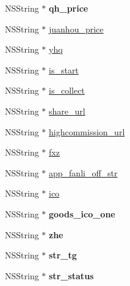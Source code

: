 \begin{DoxyCompactItemize}
N\+S\+String $\ast$ {\bfseries qh\+\_\+price}
\item 
N\+S\+String $\ast$ \mbox{\hyperlink{interface_f_n_base_product_model_adf6aed6aa71562ed139ef8aeeb3c858c}{juanhou\+\_\+price}}
\item 
N\+S\+String $\ast$ \mbox{\hyperlink{interface_f_n_base_product_model_a99460f24979c5ea79a4b1e11f45c63b7}{yhq}}
\item 
N\+S\+String $\ast$ \mbox{\hyperlink{interface_f_n_base_product_model_adcf67d2d4d13ae6539d76184c365844a}{is\+\_\+start}}
\item 
N\+S\+String $\ast$ \mbox{\hyperlink{interface_f_n_base_product_model_adc2ea1e4dc1097b9ad9f9e8a3d464330}{is\+\_\+collect}}
\item 
N\+S\+String $\ast$ \mbox{\hyperlink{interface_f_n_base_product_model_a5c05c57f213cd88591aa336cc6cd99c1}{share\+\_\+url}}
\item 
N\+S\+String $\ast$ \mbox{\hyperlink{interface_f_n_base_product_model_add360d501db9e8f3df436d807b91e7f9}{highcommission\+\_\+url}}
\item 
N\+S\+String $\ast$ \mbox{\hyperlink{interface_f_n_base_product_model_af7149fd14a3702dd6a57bf00d6695a78}{fxz}}
\item 
N\+S\+String $\ast$ \mbox{\hyperlink{interface_f_n_base_product_model_a19eb47a3b3951787f43b27b505baba39}{app\+\_\+fanli\+\_\+off\+\_\+str}}
\item 
N\+S\+String $\ast$ \mbox{\hyperlink{interface_f_n_base_product_model_af2c5e73c71634dd9f51ba6103c41dd8a}{ico}}
\item 
\mbox{\label{interface_f_n_base_product_model_a98ec430b1e9baf9fc2f5ed37c222aab5}} 
N\+S\+String $\ast$ {\bfseries goods\+\_\+ico\+\_\+one}
\item 
\mbox{\label{interface_f_n_base_product_model_a496cc8f1c07b5d0923d57818b2d2e49e}} 
N\+S\+String $\ast$ {\bfseries zhe}
\item 
\mbox{\label{interface_f_n_base_product_model_af6026572dc0cb492f6795be2b3847c56}} 
N\+S\+String $\ast$ {\bfseries str\+\_\+tg}
\item 
\mbox{\label{interface_f_n_base_product_model_a56458e06f34370a9ffdf36f8ae08acbc}} 
N\+S\+String $\ast$ {\bfseries str\+\_\+status}
\item 

\end{DoxyCompactItemize}
